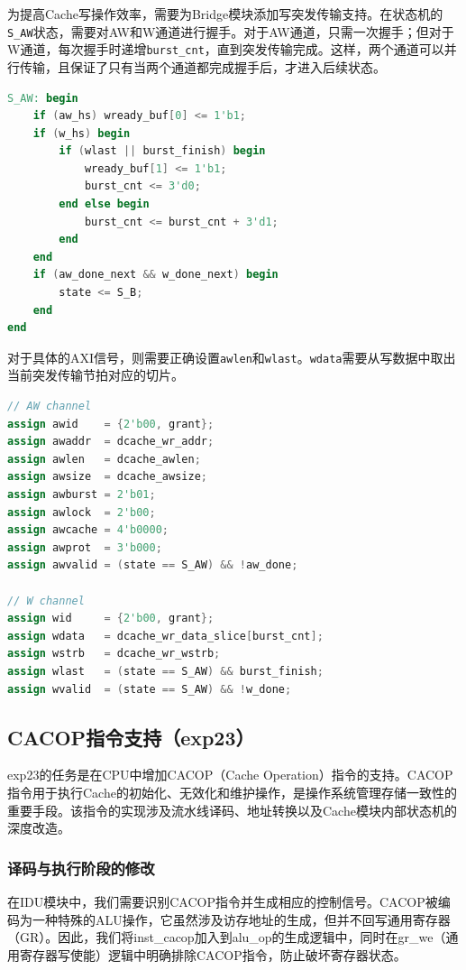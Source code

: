 \documentclass[11pt]{article}
\begin{document}
为提高Cache写操作效率，需要为Bridge模块添加写突发传输支持。在状态机的\texttt{S_AW}状态，需要对AW和W通道进行握手。对于AW通道，只需一次握手；但对于W通道，每次握手时递增\texttt{burst_cnt}，直到突发传输完成。这样，两个通道可以并行传输，且保证了只有当两个通道都完成握手后，才进入后续状态。

\begin{lstlisting}[language=Verilog]
S_AW: begin
    if (aw_hs) wready_buf[0] <= 1'b1;
    if (w_hs) begin
        if (wlast || burst_finish) begin
            wready_buf[1] <= 1'b1;
            burst_cnt <= 3'd0;
        end else begin
            burst_cnt <= burst_cnt + 3'd1;
        end
    end
    if (aw_done_next && w_done_next) begin
        state <= S_B;
    end
end
\end{lstlisting}

对于具体的AXI信号，则需要正确设置\texttt{awlen}和\texttt{wlast}。\texttt{wdata}需要从写数据中取出当前突发传输节拍对应的切片。

\begin{lstlisting}[language=Verilog]
// AW channel
assign awid    = {2'b00, grant};
assign awaddr  = dcache_wr_addr;
assign awlen   = dcache_awlen;
assign awsize  = dcache_awsize;
assign awburst = 2'b01;
assign awlock  = 2'b00;
assign awcache = 4'b0000;
assign awprot  = 3'b000;
assign awvalid = (state == S_AW) && !aw_done;

// W channel
assign wid     = {2'b00, grant};
assign wdata   = dcache_wr_data_slice[burst_cnt];
assign wstrb   = dcache_wr_wstrb;
assign wlast   = (state == S_AW) && burst_finish;
assign wvalid  = (state == S_AW) && !w_done;
\end{lstlisting}

\subsection{CACOP指令支持（exp23）}

exp23的任务是在CPU中增加CACOP（Cache Operation）指令的支持。CACOP指令用于执行Cache的初始化、无效化和维护操作，是操作系统管理存储一致性的重要手段。该指令的实现涉及流水线译码、地址转换以及Cache模块内部状态机的深度改造。

\subsubsection{译码与执行阶段的修改}

在IDU模块中，我们需要识别CACOP指令并生成相应的控制信号。CACOP被编码为一种特殊的ALU操作，它虽然涉及访存地址的生成，但并不回写通用寄存器（GR）。因此，我们将inst_cacop加入到alu_op的生成逻辑中，同时在gr_we（通用寄存器写使能）逻辑中明确排除CACOP指令，防止破坏寄存器状态。
\end{document}
